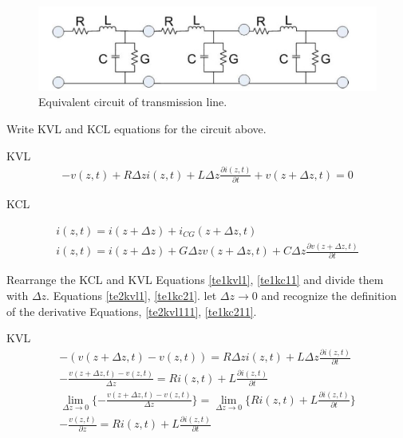 \documentclass{ximera}
\begin{document}
\begin{figure}[htbp]
\begin{center}
\includegraphics[scale=0.4]{../jpg/tlmadeupofcircuits.jpg}
\end{center}
\caption{Equivalent circuit of transmission line.}
\label{lineeqc}
\end{figure}



Write  KVL and KCL equations for the circuit above.

KVL
\begin{eqnarray}
-v(z,t) + R \Delta z  i(z,t) + L \Delta z \frac{\partial
 i(z,t)}{\partial t} + v(z+ \Delta z,t) = 0 \nonumber
\end{eqnarray}

KCL

\begin{eqnarray}
i(z,t)=i(z+\Delta z)+ i_{CG}(z+\Delta z,t) \nonumber   \\
i(z,t)=i(z+\Delta z)+ G \Delta z v(z+\Delta z,t)+C\Delta z
\frac{\partial v(z+\Delta z,t)}{\partial t} \nonumber
\end{eqnarray}


Rearrange the KCL and KVL Equations \ref{te1kvl1}, \ref{te1kc11} and divide them with
$\Delta z$.  Equations \ref{te2kvl1}, \ref{te1kc21}.
let $\Delta z \to 0$ and recognize the definition of the
derivative Equations, \ref{te2kvl111}, \ref{te1kc211}.

KVL
\begin{eqnarray}
-( v(z+ \Delta z ,t)- v(z,t))=R \Delta z i(z,t)+L \Delta z
 \frac{\partial i(z,t)}{\partial t} \label{te1kvl1}  \\ 
 -\frac{ v(z+ \Delta z ,t)- v(z,t)}{\Delta z}=R i(z,t)+L 
 \frac{\partial i(z,t)}{\partial t}  \label{te2kvl1} \\
\lim_{\Delta z \to 0} \{ -\frac{ v(z+ \Delta z ,t)- v(z,t)}{\Delta z}\}=  \lim_{\Delta z \to 0} \{   R i(z,t)+L 
 \frac{\partial i(z,t)}{\partial t} \} \label{te2kvl111} \\
-\frac{v(z,t) }{\partial z}=R i(z,t)+L 
 \frac{\partial i(z,t)}{\partial t} \label{te3kvl1}
\end{eqnarray}
\end{document}
